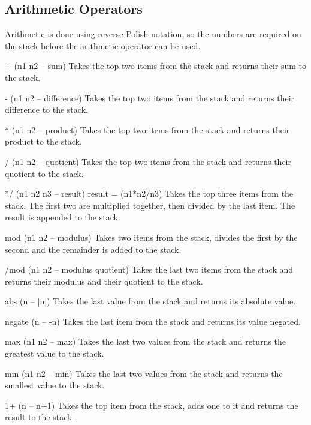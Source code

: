 \documentclass[a4paper, 11pt, openany]{book}
\begin{document}
\subsection{Arithmetic Operators}

Arithmetic is done using reverse Polish notation, so the numbers are required on the stack before the arithmetic operator can be used.

\begin{forthbox}
  +        (n1 n2 -- sum)
           Takes the top two items from the stack and returns
           their sum to the stack.

  -        (n1 n2 -- difference)
           Takes the top two items from the stack and returns
           their difference to the stack.

  *        (n1 n2 -- product)
           Takes the top two items from the stack and returns
           their product to the stack.

  /        (n1 n2 -- quotient)
           Takes the top two items from the stack and returns
           their quotient to the stack.

  */       (n1 n2 n3 -- result)   result = (n1*n2/n3)
           Takes the top three items from the stack. The first
           two are multiplied together, then divided by the last
           item. The result is appended to the stack.

  mod      (n1 n2 -- modulus)
           Takes two items from the stack, divides the first by
           the second and the remainder is added to the stack.

  /mod     (n1 n2 -- modulus quotient)
           Takes the last two items from the stack and returns
           their modulus and their quotient to the stack.

  abs      (n -- |n|)
           Takes the last value from the stack and returns its
           absolute value.

  negate   (n -- -n)
           Takes the last item from the stack and returns its
           value negated.

  max      (n1 n2 -- max)
           Takes the last two values from the stack and returns
           the greatest value to the stack.

  min      (n1 n2 -- min)
           Takes the last two values from the stack and returns
           the smallest value to the stack.

  1+       (n -- n+1)
           Takes the top item from the stack, adds one to it and
           returns the result to the stack.


\end{forthbox}
\end{document}
